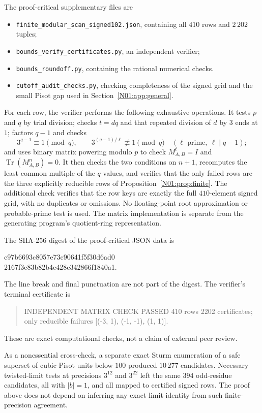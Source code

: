 \documentclass[11pt,a4paper]{article}
\theoremstyle{definition}\newtheorem{definition}[theorem]{Definition}
\theoremstyle{remark}\newtheorem{remark}[theorem]{Remark}
\DeclareMathOperator{\Tr}{Tr}\DeclareMathOperator{\tr}{tr}\DeclareMathOperator{\Nm}{N}
\begin{document}
The proof-critical supplementary files are
\begin{itemize}
\item \texttt{finite\_modular\_scan\_signed102.json}, containing all
$410$ rows and $2\,202$ tuples;
\item \texttt{bounds\_verify\_certificates.py}, an independent verifier;
\item \texttt{bounds\_roundoff.py}, containing the rational numerical checks.
\item \texttt{cutoff\_audit\_checks.py}, checking completeness of the
signed grid and the small Pisot gap used in Section~\ref{N01:app:general}.
\end{itemize}
For each row, the verifier performs the following exhaustive operations.
It tests $p$ and $q$ by trial division; checks $t=dq$ and that repeated
division of $d$ by $3$ ends at $1$; factors $q-1$ and checks
\[
 3^{q-1}\equiv1\pmod q,\qquad
 3^{(q-1)/\ell}\not\equiv1\pmod q
 \quad(\ell\text{ prime},\ \ell\mid q-1);
\]
and uses binary matrix powering modulo $p$ to check
$M_{A,B}^{t}=I$ and $\Tr(M_{A,B}^{n})=0$. It then checks the two
conditions on $n+1$, recomputes the least common multiple of the
$q$-values, and verifies that the only failed rows are the three
explicitly reducible rows of Proposition~\ref{N01:prop:finite}.
The additional check verifies that the row keys are exactly the full
$410$-element signed grid, with no duplicates or omissions.
No floating-point root approximation or probable-prime test is used.
The matrix implementation is separate from the generating program's
quotient-ring representation.

The SHA-256 digest of the proof-critical JSON data is
\begin{center}\small\ttfamily
c97b6693c8057e73c90641f5f30d6ad0\\
2167f3e83b82b4c428c342866f1840a1.
\end{center}
The line break and final punctuation are not part of the digest.
The verifier's terminal certificate is
\begin{quote}\small\ttfamily
INDEPENDENT MATRIX CHECK PASSED 410 rows 2202 certificates;\newline
only reducible failures [(-3, 1), (-1, -1), (1, 1)].
\end{quote}
These are exact computational checks, not a claim of external peer review.

As a nonessential cross-check, a separate exact Sturm enumeration of
a safe superset of cubic Pisot units below $100$ produced $10\,277$
candidates. Necessary twisted-limit tests at precisions $3^{12}$
and $3^{22}$ left the same $394$ odd-residue candidates, all with
$|b|=1$, and all mapped to certified signed rows. The proof above
does not depend on inferring any exact limit identity from such
finite-precision agreement.
\end{document}
